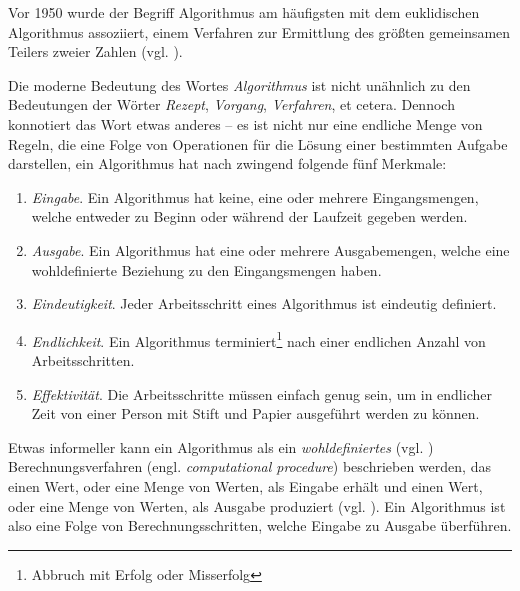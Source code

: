 
Vor 1950 wurde der Begriff Algorithmus am häufigsten mit dem euklidischen Algorithmus assoziiert, einem Verfahren zur Ermittlung des größten gemeinsamen Teilers zweier Zahlen (vgl. \cite[2]{taocp1}).

Die moderne Bedeutung des Wortes \emph{Algorithmus} ist nicht unähnlich zu den Bedeutungen der Wörter \emph{Rezept}, \emph{Vorgang}, \emph{Verfahren}, et cetera. Dennoch konnotiert das Wort etwas anderes -- es ist nicht nur eine endliche Menge von Regeln, die eine Folge von Operationen für die Lösung einer bestimmten Aufgabe darstellen, ein Algorithmus hat nach \cite[1]{hsr1997} zwingend folgende fünf Merkmale:

\begin{enumerate}
    \item \emph{Eingabe}. Ein Algorithmus hat keine, eine oder mehrere Eingangsmengen, welche entweder zu Beginn oder während der Laufzeit gegeben werden.

    \item \emph{Ausgabe}. Ein Algorithmus hat eine oder mehrere Ausgabemengen, welche eine wohldefinierte Beziehung zu den Eingangsmengen haben.
    
    \item \emph{Eindeutigkeit}. Jeder Arbeitsschritt eines Algorithmus ist eindeutig definiert.

    \item \emph{Endlichkeit}. Ein Algorithmus terminiert\footnote{Abbruch mit Erfolg oder Misserfolg} nach einer endlichen Anzahl von Arbeitsschritten.

    \item \emph{Effektivität}. Die Arbeitsschritte müssen einfach genug sein, um in endlicher Zeit von einer Person mit Stift und Papier ausgeführt werden zu können. 
\end{enumerate}

Etwas informeller kann ein Algorithmus als ein \emph{wohldefiniertes} (vgl. \cite[16]{alu2009}) Berechnungsverfahren (engl. \emph{computational procedure}) beschrieben werden, das einen Wert, oder eine Menge von Werten, als Eingabe erhält und einen Wert, oder eine Menge von Werten, als Ausgabe produziert (vgl. \cite[5]{clrs2001}). Ein Algorithmus ist also eine Folge von Berechnungsschritten, welche Eingabe zu Ausgabe überführen.


